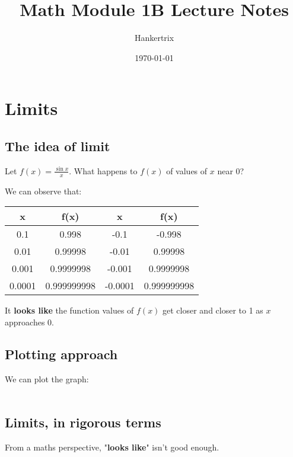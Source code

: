 \documentclass[11pt]{article}
\author{Hankertrix}
\date{\today}
\title{Math Module 1B Lecture Notes}
\begin{document}
\maketitle
\setcounter{tocdepth}{2}
\tableofcontents

\newpage

\section{Limits}
\label{sec:org803a9e2}

\subsection{The idea of limit}
\label{sec:orgbe71e73}

Let \(f(x) = \frac{\sin x}{x}\). What happens to \(f(x)\) of values of \(x\) near 0?

We can observe that:

\begin{center}
\begin{tabular}{c c|c c}
x & f(x) & x & f(x) \\
\hline
0.1 & 0.998 & -0.1 & -0.998 \\
0.01 & 0.99998 & -0.01 & 0.99998 \\
0.001 & 0.9999998 & -0.001 & 0.9999998 \\
0.0001 & 0.999999998 & -0.0001 & 0.999999998
\end{tabular}
\end{center}

It \textbf{looks like} the function values of \(f(x)\) get closer and closer to 1 as \(x\) approaches 0.


\subsection{Plotting approach}
\label{sec:org7bab5ca}

We can plot the graph:
\\[0pt]
\\[0pt]


\newpage

\subsection{Limits, in rigorous terms}
\label{sec:orgfdcef37}
From a maths perspective, "\textbf{looks like}" isn't good enough.
\\[0pt]
\end{document}
